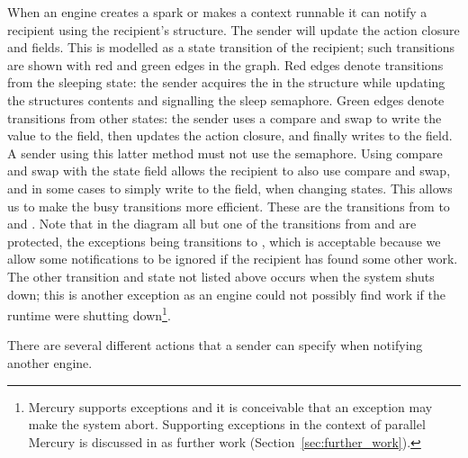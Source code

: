 When an engine creates a spark or makes a context runnable
it can notify a recipient using the recipient's
\enginesleepsync structure.
The sender will update the action closure and
 fields.
This is modelled as a state transition of the recipient;
such transitions are shown with red and green edges in the graph.
Red edges denote transitions from the sleeping state:
the sender acquires the  in the
\enginesleepsync structure while updating the structures contents and
signalling the sleep semaphore.
Green edges denote transitions from other states:
the sender uses a compare and swap to write the  value to the
 field,
then updates the action closure,
and finally writes  to the  field.
A sender using this latter method must not use the semaphore.
Using compare and swap with the state field allows the recipient to also
use compare and swap, and in some cases to simply write to the field,
when changing states.
This allows us to make the busy transitions more efficient.
These are the transitions from
 to
 and
.
Note that in the diagram all but one of the transitions from
 and 
are protected,
the exceptions being transitions to ,
which is acceptable because we allow some notifications to be ignored if the
recipient has found some other work.
The other transition and state not listed above occurs when the system shuts
down;
this is another exception as an engine could not possibly find work if the
runtime were shutting down\footnote{
    Mercury supports exceptions and it is conceivable that an exception may
    make the system abort.
    Supporting exceptions in the context of parallel Mercury is discussed in
    as further work (Section~\ref{sec:further_work}).
}.

There are several different actions that a sender can specify when notifying
another engine.

